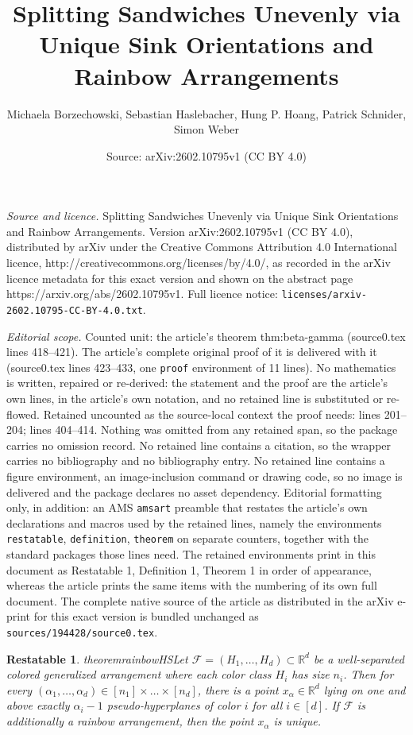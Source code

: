 \documentclass[10pt,a4paper]{amsart}
\title{Splitting Sandwiches Unevenly via Unique Sink Orientations and Rainbow Arrangements}
\author{Michaela Borzechowski, Sebastian Haslebacher, Hung P. Hoang, Patrick Schnider, Simon Weber}
\date{Source: arXiv:2602.10795v1 (CC BY 4.0)}
\newtheorem{restatable}{Restatable}
\newcommand{\R}{\mathbb{R}}
\begin{document}
\maketitle

\noindent\emph{Source and licence.} Splitting Sandwiches Unevenly via Unique Sink Orientations and Rainbow Arrangements. Version arXiv:2602.10795v1 (CC BY 4.0), distributed by arXiv under the Creative Commons Attribution 4.0 International licence, http://creativecommons.org/licenses/by/4.0/, as recorded in the arXiv licence metadata for this exact version and shown on the abstract page https://arxiv.org/abs/2602.10795v1. Full licence notice: \texttt{licenses/arxiv-2602.10795-CC-BY-4.0.txt}.\par\smallskip

\noindent\textit{Editorial scope.} Counted unit: the article's theorem thm:beta-gamma (source0.tex lines 418--421). The article's complete original proof of it is delivered with it (source0.tex lines 423--433, one \texttt{proof} environment of 11 lines). No mathematics is written, repaired or re-derived: the statement and the proof are the article's own lines, in the article's own notation, and no retained line is substituted or re-flowed.  Retained uncounted as the source-local context the proof needs: lines 201--204; lines 404--414.  Nothing was omitted from any retained span, so the package carries no omission record.  No retained line contains a citation, so the wrapper carries no bibliography and no bibliography entry.  No retained line contains a figure environment, an image-inclusion command or drawing code, so no image is delivered and the package declares no asset dependency.  Editorial formatting only, in addition: an AMS \texttt{amsart} preamble that restates the article's own declarations and macros used by the retained lines, namely the environments \texttt{restatable}, \texttt{definition}, \texttt{theorem} on separate counters, together with the standard packages those lines need.  The retained environments print in this document as Restatable 1, Definition 1, Theorem 1 in order of appearance, whereas the article prints the same items with the numbering of its own full document.  The complete native source of the article as distributed in the arXiv e-print for this exact version is bundled unchanged as \texttt{sources/194428/source0.tex}.
\begin{restatable}{theorem}{rainbowHS}\label{thm:rainbowHS}
Let $\mathcal{F}=(H_1, \ldots,H_d)\subset\R^d$ be a well-separated colored generalized arrangement where each color class $H_i$ has size $n_i$. Then for every $(\alpha_1, \dots, \alpha_d) \in [n_1] \times \dots \times [n_d]$, there is a point $x_{\alpha} \in \mathbb{R}^d$ lying on one and above exactly $\alpha_i - 1$ pseudo-hyperplanes of color $i$ for all $i \in [d]$.
If $\mathcal{F}$ is additionally a rainbow arrangement, then the point $x_\alpha$ is unique.
\end{restatable}
\end{document}
